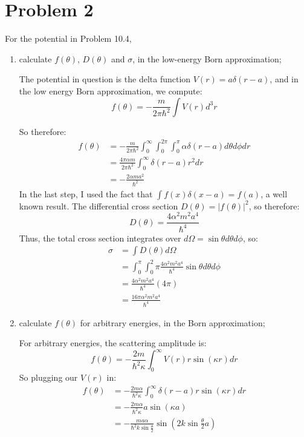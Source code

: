 \documentclass[10pt]{article}
\begin{document}
	\section*{Problem 2}
	For the potential in Problem 10.4, 
	\begin{enumerate}[label=(\alph*)]
		\item calculate $f(\theta)$, $D(\theta)$ and $\sigma$, in the low-energy Born approximation;
		
		\begin{solution}
			The potential in question is the delta function $V(r) = a \delta(r - a)$, and in the low energy 
			Born approximation, we compute: 
			\[
			f(\theta) = -\frac{m}{2\pi\hbar^2}\int V(r) d^3r
			\] 
			
			So therefore:
			\begin{align*}
				f(\theta) &= -\frac{m}{2\pi\hbar^2}\int_0^\infty \int_0^{2\pi} \int_0^\pi \alpha \delta(r-a)
				d\theta d\phi dr\\
					&= \frac{4\pi\alpha m}{2\pi\hbar^2}\int_0^\infty \delta(r-a)r^2 dr\\
					&= -\frac{2\alpha ma^2}{\hbar^2}
			\end{align*}
			In the last step, I used the fact that $\int f(x) \delta(x - a) = f(a)$, a well known result. The 
			differential cross section $D(\theta) = |f(\theta)|^2$, so therefore: 
			\[
			D(\theta) = \frac{4\alpha^2 m^2 a^4}{\hbar^4}
			\] 
			Thus, the total cross section integrates over $d\Omega = \sin \theta d\theta d\phi$, so:
			\begin{align*}
				\sigma &= \int D(\theta) d\Omega\\
					   &=\int_0^\pi \int_0^2\pi \frac{4\alpha^2m^2a^4}{\hbar^4} \sin \theta d\theta d\phi \\
					   &= \frac{4\alpha^2m^2a^4}{\hbar^4} (4\pi) \\
					   &= \frac{16\pi\alpha^2 m^2 a^4}{\hbar^4} 
			\end{align*}
		\end{solution}
		\item calculate $f(\theta)$ for arbitrary energies, in the Born approximation;

		\begin{solution}
			For arbitrary energies, the scattering amplitude is: 
			\[
			f(\theta) = -\frac{2m}{\hbar^2 \kappa}\int_0^\infty V(r) r \sin(\kappa r) dr
			\] 
			So plugging our $V(r)$ in: 
			\begin{align*}
				f(\theta) &= -\frac{2m\alpha }{\hbar^2 \kappa}\int_0^\infty \delta(r - a)r \sin (\kappa r) dr\\
				&= -\frac{2m\alpha}{\hbar^2 \kappa} a \sin(\kappa a) \\
				&= -\frac{ma\alpha}{\hbar^2 k \sin \frac{\theta}{2}}\sin(2k\sin \frac{\theta}{2}a)
			\end{align*}
		\end{solution}
		
		
	\end{enumerate}
	\pagebreak	
\end{document}

